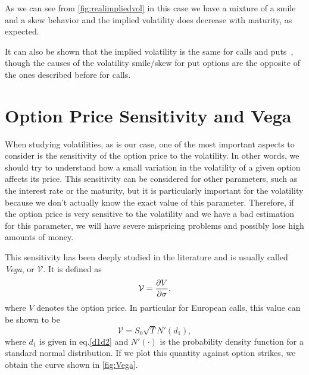 As we can see from \autoref{fig:realimpliedvol} in this case we have a mixture of a smile and a skew behavior and the implied volatility does decrease with maturity, as expected.

It can also be shown that the implied volatility is the same for calls and puts~\citep{Hull}, though the causes of the volatility smile/skew for put options are the opposite of the ones described before for calls.

\iffalse
\hl{Though the implied volatility is usually defined for European options, we can just as easily adapt this term for Barrier options.} We again have to solve eq.\eqref{impvolform}, but now using the (Barrier) implied volatility, $\sigma_{imp,Barr}$, to generate the theoretical Barrier option price, $C(\sigma_{imp,Barr})$. This result will be used later when we study barrier options.
\fi

\section{Option Price Sensitivity and Vega}
\label{section:vega}
When studying volatilities, as is our case, one of the most important aspects to consider is the sensitivity of the option price to the volatility. In other words, we should try to understand how a small variation in the volatility of a given option affects its price. This sensitivity can be considered for other parameters, such as the interest rate or the maturity, but it is particularly important for the volatility because we don't actually know the exact value of this parameter. Therefore, if the option price is very sensitive to the volatility and we have a bad estimation for this parameter, we will have severe mispricing problems and possibly lose high amounts of money.

This sensitivity has been deeply studied in the literature and is usually called \emph{Vega}, or $\mathcal{V}$. It is defined as
\begin{equation}
\mathcal{V}=\pdv{V}{\sigma},
\end{equation}
\noindent where $V$ denotes the option price.
In particular for European calls, this value can be shown to be~\citep{Hull}
\begin{equation}
\mathcal{V}=S_0\sqrt{T}N'(d_1),
\end{equation}
\noindent where $d_1$ is given in eq.\eqref{d1d2} and $N'(\cdot)$ is the probability density function for a standard normal distribution.
If we plot this quantity against option strikes, we obtain the curve shown in \autoref{fig:Vega}.

